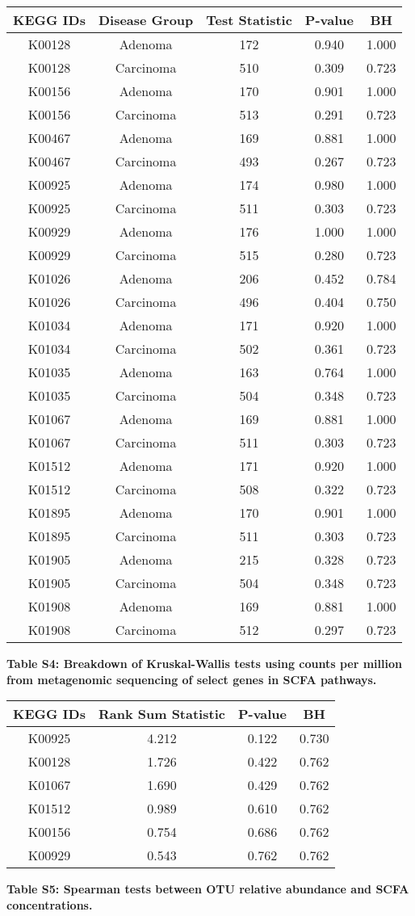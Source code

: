 \documentclass[11pt,]{article}
\begin{document}
\begin{longtable}[]{@{}ccccc@{}}
\toprule
KEGG IDs & Disease Group & Test Statistic & P-value & BH\tabularnewline
\midrule
\endhead
K00128 & Adenoma & 172 & 0.940 & 1.000\tabularnewline
K00128 & Carcinoma & 510 & 0.309 & 0.723\tabularnewline
K00156 & Adenoma & 170 & 0.901 & 1.000\tabularnewline
K00156 & Carcinoma & 513 & 0.291 & 0.723\tabularnewline
K00467 & Adenoma & 169 & 0.881 & 1.000\tabularnewline
K00467 & Carcinoma & 493 & 0.267 & 0.723\tabularnewline
K00925 & Adenoma & 174 & 0.980 & 1.000\tabularnewline
K00925 & Carcinoma & 511 & 0.303 & 0.723\tabularnewline
K00929 & Adenoma & 176 & 1.000 & 1.000\tabularnewline
K00929 & Carcinoma & 515 & 0.280 & 0.723\tabularnewline
K01026 & Adenoma & 206 & 0.452 & 0.784\tabularnewline
K01026 & Carcinoma & 496 & 0.404 & 0.750\tabularnewline
K01034 & Adenoma & 171 & 0.920 & 1.000\tabularnewline
K01034 & Carcinoma & 502 & 0.361 & 0.723\tabularnewline
K01035 & Adenoma & 163 & 0.764 & 1.000\tabularnewline
K01035 & Carcinoma & 504 & 0.348 & 0.723\tabularnewline
K01067 & Adenoma & 169 & 0.881 & 1.000\tabularnewline
K01067 & Carcinoma & 511 & 0.303 & 0.723\tabularnewline
K01512 & Adenoma & 171 & 0.920 & 1.000\tabularnewline
K01512 & Carcinoma & 508 & 0.322 & 0.723\tabularnewline
K01895 & Adenoma & 170 & 0.901 & 1.000\tabularnewline
K01895 & Carcinoma & 511 & 0.303 & 0.723\tabularnewline
K01905 & Adenoma & 215 & 0.328 & 0.723\tabularnewline
K01905 & Carcinoma & 504 & 0.348 & 0.723\tabularnewline
K01908 & Adenoma & 169 & 0.881 & 1.000\tabularnewline
K01908 & Carcinoma & 512 & 0.297 & 0.723\tabularnewline
\bottomrule
\end{longtable}

\newpage

\textbf{Table S4: Breakdown of Kruskal-Wallis tests using counts per
million from metagenomic sequencing of select genes in SCFA pathways.}

\begin{longtable}[]{@{}cccc@{}}
\toprule
KEGG IDs & Rank Sum Statistic & P-value & BH\tabularnewline
\midrule
\endhead
K00925 & 4.212 & 0.122 & 0.730\tabularnewline
K00128 & 1.726 & 0.422 & 0.762\tabularnewline
K01067 & 1.690 & 0.429 & 0.762\tabularnewline
K01512 & 0.989 & 0.610 & 0.762\tabularnewline
K00156 & 0.754 & 0.686 & 0.762\tabularnewline
K00929 & 0.543 & 0.762 & 0.762\tabularnewline
\bottomrule
\end{longtable}

\newpage

\textbf{Table S5: Spearman tests between OTU relative abundance and SCFA
concentrations.}
\end{document}
